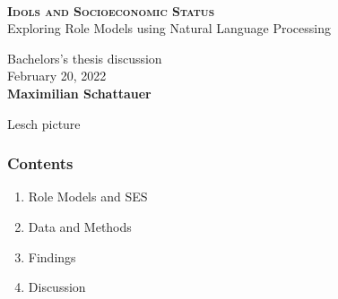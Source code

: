 



\begin{frame}
	\begin{center}
		\begin{block}
			{\centering\\
				\medskip
				\textbf{\textsc{Idols and Socioeconomic Status}}\\
                Exploring Role Models using Natural Language Processing\\
				\medskip}
		\end{block}

		\bigskip

		Bachelors's thesis discussion\\
		\medskip
		February 20, 2022\\

		\vspace{1cm}
		\textbf{Maximilian Schattauer}
	\end{center}
\end{frame}


\begin{frame}
    Lesch picture
\end{frame}


\begin{frame}
    \frametitle{Contents}
    \begin{enumerate}
        \item Role Models and SES
        \item Data and Methods
        \item Findings
        \item Discussion
    \end{enumerate}
\end{frame}


